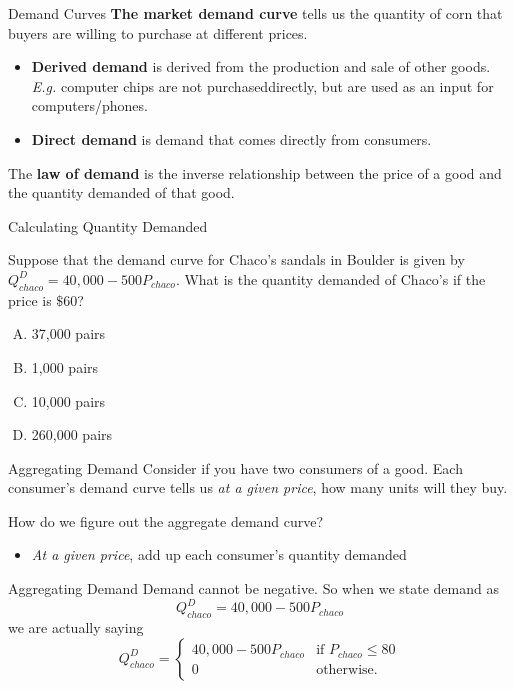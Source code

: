 \documentclass[12pt,t]{beamer}
\begin{document}
\begin{frame}{Demand Curves}
  \textbf{The market demand curve} tells us the quantity of corn that buyers are willing to purchase at different prices.
  \begin{itemize}
    \item \textbf{Derived demand} is derived from the production and sale of other goods. \emph{E.g.} computer chips are not purchaseddirectly, but are used as an input for computers/phones.
    \item \textbf{Direct demand} is demand that comes directly from consumers.
  \end{itemize}

  \pause\bigskip
  The \textbf{law of demand} is the inverse relationship between the price of a good and the quantity demanded of that good.
\end{frame}


\begin{frame}{Calculating Quantity Demanded}

\bigskip
Suppose that the demand curve for Chaco's sandals in Boulder is given by $Q^D_{chaco} = 40,000  - 500P_{chaco}$. What is the quantity demanded of Chaco's if the price is $ \$ 60 $?

  \bigskip
  \begin{enumerate}[A)]
    \item 37,000 pairs
    \item  1,000 pairs
    \item 10,000 pairs
    \item 260,000 pairs
  \end{enumerate}
\end{frame}

\begin{frame}{Aggregating Demand}
  Consider if you have two consumers of a good. Each consumer's demand curve tells us \emph{at a given price}, how many units will they buy.

  \bigskip
  How do we figure out the aggregate demand curve? 
  
  \pause 
  \begin{itemize}
    \item \emph{At a given price}, add up each consumer's quantity demanded
  \end{itemize}
\end{frame}

\begin{frame}{Aggregating Demand}
  Demand cannot be negative. So when we state demand as
  $$
    Q^D_{chaco} = 40,000  - 500P_{chaco}
  $$
  we are actually saying
  $$
    Q^D_{chaco} =
    \begin{cases}
      40,000  - 500P_{chaco} & \text{if } P_{chaco} \leq 80 \\
      0                      & \text{otherwise}.
    \end{cases}
  $$
\end{frame}
\end{document}

